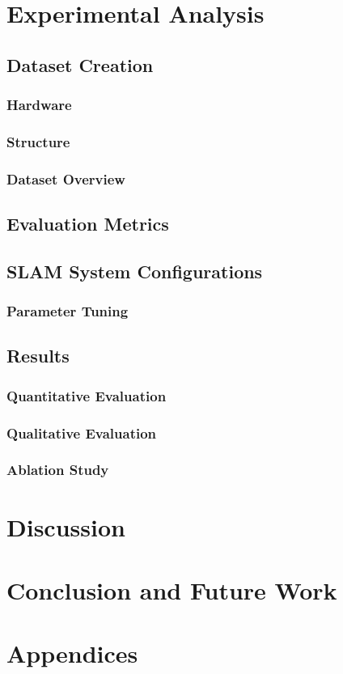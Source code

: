 \documentclass[12pt]{article}
\begin{document}
\section{Experimental Analysis}

\subsection{Dataset Creation}

\subsubsection{Hardware}

\subsubsection{Structure}

\subsubsection{Dataset Overview}

\subsection{Evaluation Metrics}

\subsection{SLAM System Configurations}

\subsubsection{Parameter Tuning}

\subsection{Results}

\subsubsection{Quantitative Evaluation}

\subsubsection{Qualitative Evaluation}

\subsubsection{Ablation Study}

\section{Discussion}

\section{Conclusion and Future Work}

\section{Appendices}
\end{document}
